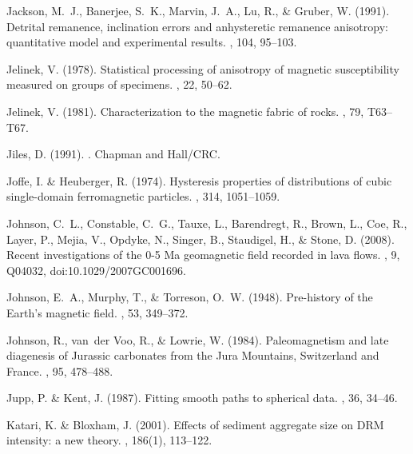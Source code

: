 \documentclass[11pt]{book}
\begin{document}
\begin{thebibliography}{}
Jackson, M.~J., Banerjee, S.~K., Marvin, J.~A., Lu, R., \& Gruber, W. (1991).
\newblock Detrital remanence, inclination errors and anhysteretic remanence
  anisotropy: quantitative model and experimental results.
, 104, 95--103.

Jelinek, V. (1978).
\newblock Statistical processing of anisotropy of magnetic susceptibility
  measured on groups of specimens.
, 22, 50--62.

Jelinek, V. (1981).
\newblock Characterization to the magnetic fabric of rocks.
, 79, T63--T67.

Jiles, D. (1991).
.
\newblock Chapman and Hall/CRC.

Joffe, I. \& Heuberger, R. (1974).
\newblock Hysteresis properties of distributions of cubic single-domain
  ferromagnetic particles.
, 314, 1051--1059.

Johnson, C.~L., Constable, C.~G., Tauxe, L., Barendregt, R., Brown, L., Coe,
  R., Layer, P., Mejia, V., Opdyke, N., Singer, B., Staudigel, H., \& Stone, D.
  (2008).
\newblock Recent investigations of the 0-5 Ma geomagnetic field recorded in
  lava flows.
, 9, Q04032,
  doi:10.1029/2007GC001696.

Johnson, E.~A., Murphy, T., \& Torreson, O.~W. (1948).
\newblock Pre-history of the Earth's magnetic field.
, 53, 349--372.

Johnson, R., van~der Voo, R., \& Lowrie, W. (1984).
\newblock Paleomagnetism and late diagenesis of Jurassic carbonates from the
  Jura Mountains, Switzerland and France.
, 95, 478--488.

Jupp, P. \& Kent, J. (1987).
\newblock Fitting smooth paths to spherical data.
, 36, 34--46.

Katari, K. \& Bloxham, J. (2001).
\newblock Effects of sediment aggregate size on DRM intensity: a new theory.
, 186(1), 113--122.


\end{thebibliography}
\end{document}

